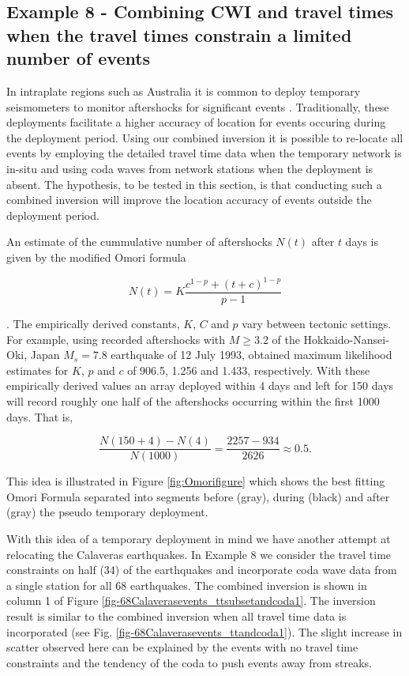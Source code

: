\documentclass[12pt,double]{article}
\begin{document}
\subsection*{Example 8 - Combining CWI and travel times when the travel times constrain a limited number of events}

In intraplate regions such as Australia it is common to deploy
temporary seismometers to monitor aftershocks for significant events
\citep{dr_Bowman90a, dr_Leonard02a}. Traditionally, these
deployments facilitate a higher accuracy of location for events
occuring during the deployment period. Using our combined inversion
it is possible to re-locate all events by employing the detailed
travel time data when the temporary network is in-situ and using
coda waves from network stations when the deployment is absent. The
hypothesis, to be tested in this section, is that conducting such a
combined inversion will improve the location accuracy of events
outside the deployment period.

An estimate of the cummulative number of aftershocks $N(t)$ after
$t$ days is given by the modified Omori formula
\begin{linenomath*} \begin{equation}
\label{eq:CumOmori}
 N(t) = K \frac{c^{1-p} + (t+c)^{1-p}}{p-1}
\end{equation} \end{linenomath*}
\citep{dr_Utsu95a}.
The empirically derived constants, $K$, $C$ and $p$ vary between
tectonic settings. For example, using recorded aftershocks with
$M\ge3.2$ of the  Hokkaido-Nansei-Oki, Japan $M_s=7.8$ earthquake of
12 July 1993, \citet{dr_Utsu95a} obtained maximum likelihood
estimates for $K$, $p$ and $c$ of 906.5, 1.256 and 1.433,
respectively.  With these empirically derived values an array
deployed within 4 days and left for 150 days will record roughly one
half of the aftershocks occurring within the first 1000 days. That
is,
\begin{linenomath*} \begin{equation}
\frac{N(150+4)-N(4)}{N(1000)} = \frac{2257-934}{2626} \approx 0.5.
\end{equation} \end{linenomath*}
This idea is illustrated in Figure \ref{fig:Omorifigure} which shows
the best fitting Omori Formula separated into segments before
(gray), during (black) and after (gray) the pseudo temporary
deployment.

With this idea of a temporary deployment in mind we have another
attempt at relocating the Calaveras earthquakes. In Example 8 we
consider the travel time constraints on half (34) of the earthquakes
and incorporate coda wave data from a single station for all 68
earthquakes. The combined inversion is shown in column 1 of Figure
\ref{fig-68Calaverasevents_ttsubsetandcoda1}. The inversion result
is similar to the combined inversion when all travel time data is
incorporated (see Fig. \ref{fig-68Calaverasevents_ttandcoda1}). The
slight increase in scatter observed here can be explained by the
events with no travel time constraints and the tendency of the coda
to push events away from streaks.
\end{document}
